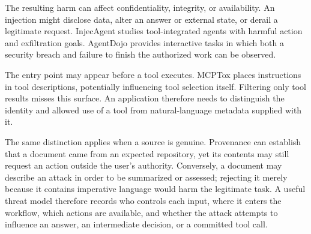 \documentclass[conference]{IEEEtran}
\begin{document}
The resulting harm can affect confidentiality, integrity, or availability. An injection might disclose data, alter an answer or external state, or derail a legitimate request. InjecAgent \cite{zhan2024injecagent} studies tool-integrated agents with harmful action and exfiltration goals. AgentDojo \cite{debenedetti2024agentdojo} provides interactive tasks in which both a security breach and failure to finish the authorized work can be observed.

The entry point may appear before a tool executes. MCPTox \cite{wang2026mcptox} places instructions in tool descriptions, potentially influencing tool selection itself. Filtering only tool results misses this surface. An application therefore needs to distinguish the identity and allowed use of a tool from natural-language metadata supplied with it.

The same distinction applies when a source is genuine. Provenance can establish that a document came from an expected repository, yet its contents may still request an action outside the user's authority. Conversely, a document may describe an attack in order to be summarized or assessed; rejecting it merely because it contains imperative language would harm the legitimate task. A useful threat model therefore records who controls each input, where it enters the workflow, which actions are available, and whether the attack attempts to influence an answer, an intermediate decision, or a committed tool call.
\end{document}
